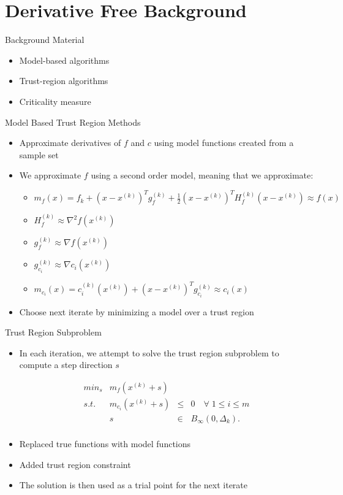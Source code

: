 \documentclass{beamer}
\newcommand{\xk}{{{x}^{(k)}}}
\newcommand{\dk}{{\Delta_k}}
\newcommand{\mk}{{m_f}}
\newcommand{\fk}{{f_k}}
\newcommand{\fgk}{{g^{(k)}_f}}
\newcommand{\fhk}{{H^{(k)}_f}}
\newcommand{\ck}{{c^{(k)}_{i}(\xk)}}
\newcommand{\cgk}{{g^{(k)}_{c_i}}}
\newcommand{\mck}{{m_{c_i}}}
\begin{document}


\section{Derivative Free Background}


\begin{frame}{Background Material}
	\begin{itemize}
		\setlength\itemsep{2em}
		\item Model-based algorithms
		\item Trust-region algorithms
		\item Criticality measure
	\end{itemize}
\end{frame}

\begin{frame}{Model Based Trust Region Methods}
	\begin{itemize}
		\item Approximate derivatives of $f$ and $c$ using model functions created from a sample set
		\item We approximate $f$ using a second order model, meaning that we approximate:
		\begin{itemize}
			\item $\mk(x) = \fk + \left(x - \xk \right)^T\fgk + \frac 1 2 \left(x - \xk \right)^T\fhk\left(x - \xk \right) \approx f(x)$
			\item $\fhk \approx \nabla ^2 f(\xk)$
			\item $\fgk \approx \nabla f(\xk)$
			\item $\cgk \approx \nabla c_i(\xk)$
			\item $\mck(x) = \ck + \left(x - \xk\right)^T\cgk \approx c_i(x)$
		\end{itemize}
		\item Choose next iterate by minimizing a model over a trust region
	\end{itemize}
\end{frame}

\begin{frame}{Trust Region Subproblem}
	\begin{itemize}
		\item In each iteration, we attempt to solve the trust region subproblem to compute a step direction $s$

		\begin{displaymath}
\begin{array}{lrcc}
min_s & \mk(\xk + s)   &	 &			\\
s.t.  &  \mck(\xk + s) & \le & 0   \quad \forall \; 1 \le i \le m	   \\
	  &  s & \in & B_{\infty}(0, \dk).  \\
\end{array}
		\end{displaymath}
		\item Replaced true functions with model functions
		\item Added trust region constraint
		\item The solution is then used as a trial point for the next iterate
	\end{itemize}
\end{frame}
\end{document}
